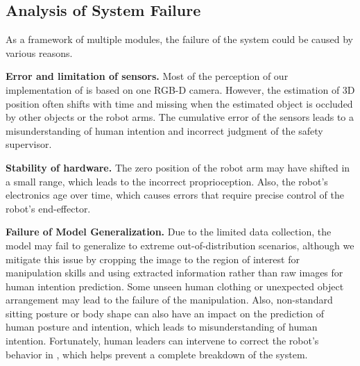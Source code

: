 \subsection{Analysis of System Failure}
As a framework of multiple modules, the failure of the system could be caused by various reasons. 

% 
\noindent\textbf{Error and limitation of sensors.} 
Most of the perception of our implementation of \our is based on one RGB-D camera. However, the estimation of 3D position often shifts with time and missing when the estimated object is occluded by other objects or the robot arms. The cumulative error of the sensors leads to a misunderstanding of human intention and incorrect judgment of the safety supervisor.

\noindent\textbf{Stability of hardware.}
The zero position of the robot arm may have shifted in a small range, which leads to the incorrect proprioception.
Also, the robot's electronics age over time, which causes errors that require precise control of the robot's end-effector.

\noindent\textbf{Failure of Model Generalization.}
Due to the limited data collection, the model may fail to generalize to extreme out-of-distribution scenarios, although we mitigate this issue by cropping the image to the region of interest for manipulation skills and using extracted information rather than raw images for human intention prediction.
Some unseen human clothing or unexpected object arrangement may lead to the failure of the manipulation.
Also, non-standard sitting posture or body shape can also have an impact on the prediction of human posture and intention, which leads to misunderstanding of human intention.
Fortunately, human leaders can intervene to correct the robot's behavior in \our, which helps prevent a complete breakdown of the system.